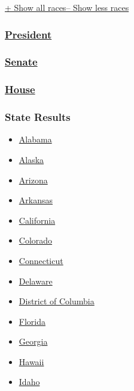 \protect\hyperlink{}{+ Show all races-- Show less races}

\hypertarget{president-1}{%
\subsubsection{\texorpdfstring{\href{//www.nytimes3xbfgragh.onion/elections/2016/results/president}{President}}{President}}\label{president-1}}

\hypertarget{senate}{%
\subsubsection{\texorpdfstring{\href{//www.nytimes3xbfgragh.onion/elections/2016/results/senate}{Senate}}{Senate}}\label{senate}}

\hypertarget{house}{%
\subsubsection{\texorpdfstring{\href{//www.nytimes3xbfgragh.onion/elections/2016/results/house}{House}}{House}}\label{house}}

\hypertarget{state-results}{%
\subsubsection{State Results}\label{state-results}}

\begin{itemize}
\tightlist
\item
  \href{//www.nytimes3xbfgragh.onion/elections/2016/results/alabama}{Alabama}
\item
  \href{//www.nytimes3xbfgragh.onion/elections/2016/results/alaska}{Alaska}
\item
  \href{//www.nytimes3xbfgragh.onion/elections/2016/results/arizona}{Arizona}
\item
  \href{//www.nytimes3xbfgragh.onion/elections/2016/results/arkansas}{Arkansas}
\item
  \href{//www.nytimes3xbfgragh.onion/elections/2016/results/california}{California}
\item
  \href{//www.nytimes3xbfgragh.onion/elections/2016/results/colorado}{Colorado}
\item
  \href{//www.nytimes3xbfgragh.onion/elections/2016/results/connecticut}{Connecticut}
\item
  \href{//www.nytimes3xbfgragh.onion/elections/2016/results/delaware}{Delaware}
\item
  \href{//www.nytimes3xbfgragh.onion/elections/2016/results/district-of-columbia}{District
  of Columbia}
\item
  \href{//www.nytimes3xbfgragh.onion/elections/2016/results/florida}{Florida}
\item
  \href{//www.nytimes3xbfgragh.onion/elections/2016/results/georgia}{Georgia}
\item
  \href{//www.nytimes3xbfgragh.onion/elections/2016/results/hawaii}{Hawaii}
\item
  \href{//www.nytimes3xbfgragh.onion/elections/2016/results/idaho}{Idaho}
\end{itemize}


